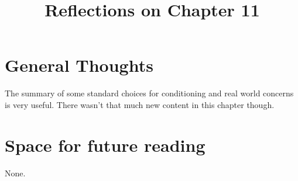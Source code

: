 \documentclass[10pt, english]{article}
\begin{document}
\title{Reflections on Chapter 11}
\date{}
\author{}

\maketitle


\section*{General Thoughts}
The summary of some standard choices for conditioning and real world concerns is very useful. There wasn't that much new content in this chapter though.

\section*{Space for future reading}
None.
\end{document}
